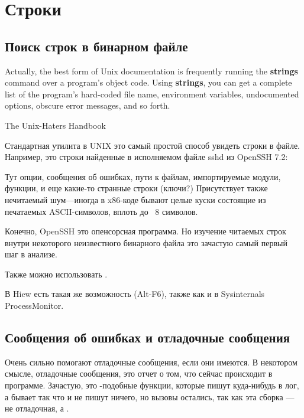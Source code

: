 \section{Строки}
\label{sec:digging_strings}



\subsection{Поиск строк в бинарном файле}

\epigraph{Actually, the best form of Unix documentation is frequently running the
\textbf{strings} command over a program’s object code. Using \textbf{strings}, you can get
a complete list of the program’s hard-coded file name, environment variables,
undocumented options, obscure error messages, and so forth.}{The Unix-Haters Handbook}

Стандартная утилита в UNIX  это самый простой способ увидеть строки в файле.
Например, это строки найденные в исполняемом файле sshd из OpenSSH 7.2:



Тут опции, сообщения об ошибках, пути к файлам, импортируемые модули, функции, и еще какие-то странные строки (ключи?)
Присутствует также нечитаемый шум---иногда в x86-коде бывают целые куски состоящие из печатаемых ASCII-символов,
вплоть до ~8 символов.

Конечно, OpenSSH это опенсорсная программа.
Но изучение читаемых строк внутри некоторого неизвестного бинарного файла это зачастую самый первый шаг в анализе.

Также можно использовать .

В Hiew есть такая же возможность (Alt-F6), также как и в Sysinternals ProcessMonitor.

\subsection{Сообщения об ошибках и отладочные сообщения}

Очень сильно помогают отладочные сообщения, если они имеются. В некотором смысле, отладочные сообщения, 
это отчет о том, что сейчас происходит в программе.
Зачастую, это \printf-подобные функции, 
которые пишут куда-нибудь в лог, а бывает так что и не пишут ничего, но вызовы остались, так как эта сборка --- не
отладочная, а .

